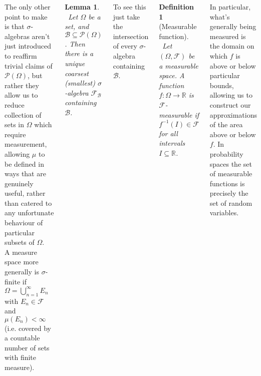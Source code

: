 \documentclass{tikzposter} %
\newtheorem{lemma}[theorem]{Lemma}
\newtheorem{definition}{Definition}
\begin{document}
\begin{columns}
{  The only other point to make is that $\sigma$-algebras aren't just introduced to reaffirm trivial claims of $\mathcal{P}(\Omega)$, but rather they allow us to reduce collection of sets in $\Omega$ which require measurement, allowing $\mu$ to be defined in ways that are genuinely useful, rather than catered to any unfortunate behaviour of particular subsets of $\Omega$. \\

  A measure space more generally is $\sigma$-finite if $\Omega = \bigcup_{n=1}^{\infty} E_{n}$ with $E_{n} \in \mathcal{F}$ and $\mu(E_{n}) < \infty$ (i.e. covered by a countable number of sets with finite measure). \\

  \begin{lemma}
    \ Let $\Omega$ be a set, and $\mathcal{B} \subseteq \mathcal{P}(\Omega)$. Then there is a unique coarsest (smallest) $\sigma$-algebra $\mathcal{F}_{\mathcal{B}}$ containing $\mathcal{B}$.
  \end{lemma}
  \hphantom{}

  To see this just take the intersection of every $\sigma$-algebra containing $\mathcal{B}$. \\

  \begin{definition}[Measurable function]
  \ Let $(\Omega, \mathcal{F})$ be a measurable space. A function $f : \Omega \to \mathbb{R}$ is $\mathcal{F}$-measurable if $f^{-1}(I) \in \mathcal{F}$ for all intervals $I \subseteq \mathbb{R}$.
  \end{definition}
  \hphantom{}

  In particular, what's generally being measured is the domain on which $f$ is above or below particular bounds, allowing us to construct our approximations of the area above or below $f$. In probability spaces the set of measurable functions is precisely the set of random variables.\\

  }
\end{columns}
\end{document}
